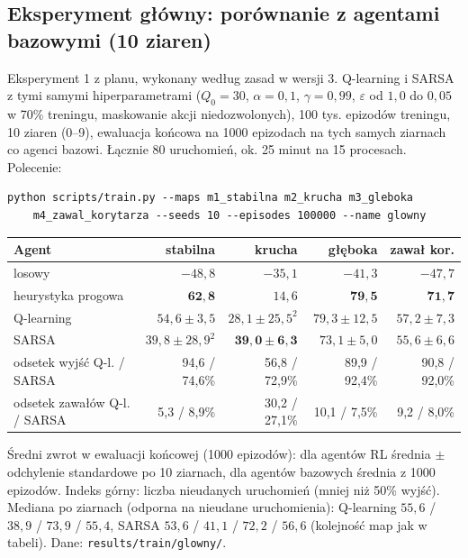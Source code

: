 \documentclass[11pt,a4paper]{article}
\begin{document}
\subsection{Eksperyment główny: porównanie z agentami bazowymi (10 ziaren)}\label{sec:glowny}
Eksperyment 1 z planu, wykonany według zasad w wersji 3. Q-learning i SARSA z tymi
samymi hiperparametrami ($Q_0=30$, $\alpha=0{,}1$, $\gamma=0{,}99$, $\varepsilon$ od
$1{,}0$ do $0{,}05$ w 70\% treningu, maskowanie akcji niedozwolonych), 100 tys.
epizodów treningu, 10 ziaren (0--9), ewaluacja końcowa na 1000 epizodach na tych
samych ziarnach co agenci bazowi. Łącznie 80 uruchomień, ok. 25 minut na 15
procesach. Polecenie:
\begin{verbatim}
python scripts/train.py --maps m1_stabilna m2_krucha m3_gleboka
    m4_zawal_korytarza --seeds 10 --episodes 100000 --name glowny
\end{verbatim}

\begin{center}
\small
\begin{tabular}{@{}lrrrr@{}}
\toprule
Agent & stabilna & krucha & głęboka & zawał kor. \\
\midrule
losowy & $-48{,}8$ & $-35{,}1$ & $-41{,}3$ & $-47{,}7$ \\
heurystyka progowa & $\mathbf{62{,}8}$ & $14{,}6$ & $\mathbf{79{,}5}$ & $\mathbf{71{,}7}$ \\
Q-learning & $54{,}6 \pm 3{,}5$ & $28{,}1 \pm 25{,}5^{2}$ & $79{,}3 \pm 12{,}5$ & $57{,}2 \pm 7{,}3$ \\
SARSA & $39{,}8 \pm 28{,}9^{2}$ & $\mathbf{39{,}0 \pm 6{,}3}$ & $73{,}1 \pm 5{,}0$ & $55{,}6 \pm 6{,}6$ \\
\midrule
odsetek wyjść Q-l. / SARSA & 94,6 / 74,6\% & 56,8 / 72,9\% & 89,9 / 92,4\% & 90,8 / 92,0\% \\
odsetek zawałów Q-l. / SARSA & 5,3 / 8,9\% & 30,2 / 27,1\% & 10,1 / 7,5\% & 9,2 / 8,0\% \\
\bottomrule
\end{tabular}
\end{center}
Średni zwrot w ewaluacji końcowej (1000 epizodów): dla agentów RL średnia $\pm$
odchylenie standardowe po 10 ziarnach, dla agentów bazowych średnia z 1000 epizodów.
Indeks górny: liczba nieudanych uruchomień (mniej niż 50\% wyjść). Mediana po ziarnach
(odporna na nieudane uruchomienia): Q-learning $55{,}6$ / $38{,}9$ / $73{,}9$ / $55{,}4$,
SARSA $53{,}6$ / $41{,}1$ / $72{,}2$ / $56{,}6$ (kolejność map jak w tabeli). Dane:
\texttt{results/train/glowny/}.
\end{document}
